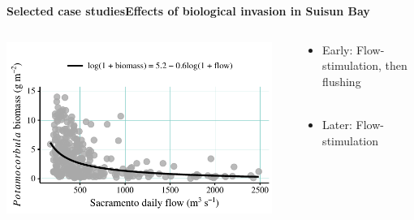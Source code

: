 \documentclass[serif]{beamer}\usepackage[]{graphicx}\usepackage[]{color}
\begin{document}
\begin{frame}{\textbf{Selected case studies}}{\textbf{Effects of biological invasion in Suisun Bay}}
\begin{columns}
\begin{column}{0.5\textwidth}
\centerline{\includegraphics[width = 0.95\textwidth, page = 3]{fig/d7flos.pdf}}
\end{column}
\begin{column}{0.5\textwidth}
\begin{itemize}
\item Early: Flow-stimulation, then flushing \\~\\
\item Later: Flow-stimulation
\end{itemize}
\end{column}
\end{columns}
\begin{columns}
\begin{column}{0.5\textwidth}
\end{column}
\end{columns}
\end{frame}
\end{document}
